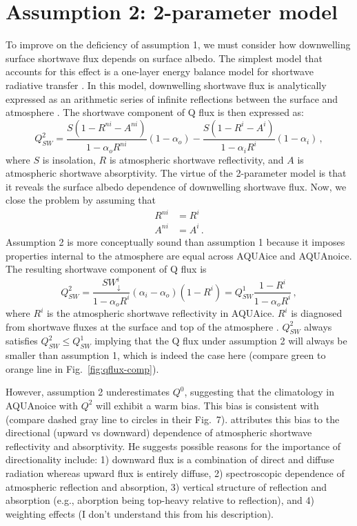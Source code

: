 \documentclass{article}
\begin{document}
\section{Assumption 2: 2-parameter model}
To improve on the deficiency of assumption 1, we must consider how downwelling surface shortwave flux depends on surface albedo. The simplest model that accounts for this effect is a one-layer energy balance model for shortwave radiative transfer \citep[e.g.,][]{qu2005,winton2005,donohoe2011}. In this model, downwelling shortwave flux is analytically expressed as an arithmetic series of infinite reflections between the surface and atmosphere \citep[equation~(2) in][]{donohoe2011}. The shortwave component of Q flux is then expressed as:
\begin{equation} \label{eq:qs2}
    Q^2_{SW}=\frac{S(1-R^{ni}-A^{ni})}{1-\alpha_oR^{ni}}(1-\alpha_o)-\frac{S(1-R^{i}-A^{i})}{1-\alpha_iR^{i}}(1-\alpha_i)\,,
\end{equation}
where $S$ is insolation, $R$ is atmospheric shortwave reflectivity, and $A$ is atmospheric shortwave absorptivity. The virtue of the 2-parameter model is that it reveals the surface albedo dependence of downwelling shortwave flux. Now, we close the problem by assuming that 
\begin{align}
    R^{ni}&=R^i\\
    A^{ni}&=A^i\,.
\end{align}
Assumption 2 is more conceptually sound than assumption 1 because it imposes properties internal to the atmosphere are equal across AQUAice and AQUAnoice. The resulting shortwave component of Q flux is
\begin{equation} \label{eq:qs2-setup}
    Q^2_{SW}=\frac{SW^{i}_{\downarrow}}{1-\alpha_oR^i}(\alpha_i-\alpha_o)(1-R^i)=Q^1_{SW}\frac{1-R^i}{1-\alpha_oR^i}\,,
\end{equation}
where $R^i$ is the atmospheric shortwave reflectivity in AQUAice. $R^i$ is diagnosed from shortwave fluxes at the surface and top of the atmosphere \citep[equation~(16) in][]{winton2005}. $Q^2_{SW}$ always satisfies $Q^2_{SW}\le Q^1_{SW}$ implying that the Q flux under assumption 2 will always be smaller than assumption 1, which is indeed the case here (compare green to orange line in Fig.~\ref{fig:qflux-comp}).

However, assumption 2 underestimates $Q^0$, suggesting that the climatology in AQUAnoice with $Q^2$ will exhibit a warm bias. This bias is consistent with \cite{winton2005} (compare dashed gray line to circles in their Fig.~7). \cite{winton2005} attributes this bias to the directional (upward vs downward) dependence of atmospheric shortwave reflectivity and absorptivity. He suggests possible reasons for the importance of directionality include: 1) downward flux is a combination of direct and diffuse radiation whereas upward flux is entirely diffuse, 2) spectroscopic dependence of atmospheric reflection and absorption, 3) vertical structure of reflection and absorption (e.g., aborption being top-heavy relative to reflection), and 4) weighting effects (I don't understand this from his description). 
\end{document}
